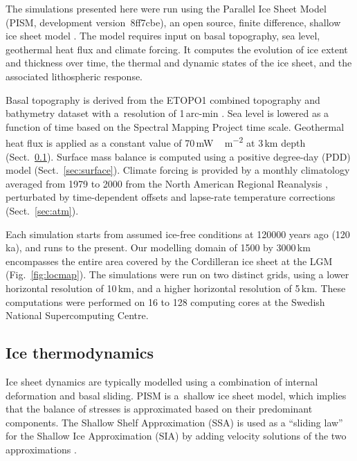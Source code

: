 \documentclass[tc, manuscript]{copernicus}
\begin{document}
The simulations presented here were run using the Parallel Ice Sheet Model
(PISM, development version~8ff7cbe), an open source,
finite difference, shallow ice sheet model \citep{PISM-authors.2015}. The model
requires input on basal topography, sea level, geothermal heat flux and
climate forcing. It computes the evolution of ice extent
and thickness over time, the thermal and dynamic
states of the ice sheet, and the associated lithospheric response.

Basal topography is derived from the ETOPO1 combined topography and bathymetry
dataset with a~resolution of 1\,arc-min \citep{Amante.Eakins.2009}. Sea level
is lowered as a function of time based on the Spectral Mapping Project
\citep[SPECMAP,][]{Imbrie.etal.1989} time scale. Geothermal heat flux
is applied as a constant value of 70\,\unit{mW\,m^{-2}} at 3\,km depth
(Sect.~\ref{sec:icedyn}). Surface mass balance is computed using a positive
degree-day (PDD) model (Sect.~\ref{sec:surface}). Climate forcing is
provided by a monthly climatology averaged from 1979 to 2000 from the North
American Regional Reanalysis \citep[NARR,][]{Mesinger.etal.2006},
perturbated by time-dependent offsets and
lapse-rate temperature corrections (Sect.~\ref{sec:atm}).

Each simulation starts from assumed ice-free conditions at 120000 years ago
(120\,ka), and runs to the present. Our modelling domain of 1500 by 3000\,km
encompasses the entire area covered by the Cordilleran ice sheet at the LGM
(Fig.~\ref{fig:locmap}). The simulations were run on two distinct grids, using
a lower horizontal resolution of 10\,km, and a higher horizontal resolution of
5\,km. These computations were performed on 16 to 128 computing cores at the
Swedish National Supercomputing Centre.

\subsection{Ice thermodynamics}
\label{sec:icedyn}

Ice sheet dynamics are typically modelled using a combination of internal
deformation and basal sliding. PISM is a~shallow ice sheet model, which implies
that the balance of stresses is approximated based on their predominant
components. The Shallow Shelf Approximation (SSA) is used as a ``sliding law''
for the Shallow Ice Approximation (SIA) by adding velocity solutions of the
two approximations
\citep[Eqns.~7--9 and 15]{Bueler.Brown.2009, Winkelmann.etal.2011}.
\end{document}
